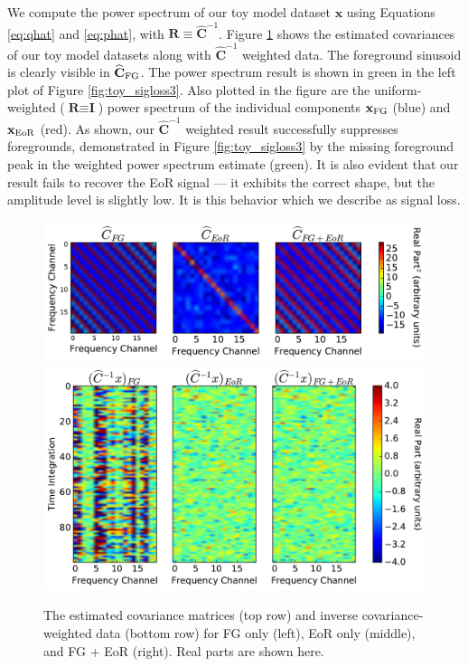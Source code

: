\documentclass[preprint2,numberedappendix,tighten]{aastex6}  %
\begin{document}
We compute the power spectrum of our toy model dataset $\textbf{x}$ using Equations \ref{eq:qhat} and \ref{eq:phat}, with $\textbf{R} \equiv \widehat{\textbf{C}}^{-1}$.  Figure \ref{fig:toy_sigloss12} shows the estimated covariances of our toy model datasets along with $\widehat{\textbf{C}}^{-1}$ weighted data. The foreground sinusoid is clearly visible in $\widehat{\textbf{C}}_{\rm FG}$.  The power spectrum result is shown in green in the left plot of Figure \ref{fig:toy_sigloss3}. Also plotted in the figure are the uniform-weighted ($\textbf{R} \equiv \textbf{I}$) power spectrum of the individual components $\textbf{x}_{\rm FG}$ (blue) and $\textbf{x}_{\rm EoR}$ (red). As shown, our $\widehat{\textbf{C}}^{-1}$ weighted result successfully suppresses foregrounds,
demonstrated in Figure \ref{fig:toy_sigloss3} by the missing foreground peak in the weighted power spectrum estimate (green).  It is also evident that our result fails to recover the EoR signal --- it exhibits the correct shape, but the amplitude level is slightly low.  It is this behavior which we describe as signal loss.

\begin{figure}
	\centering
	\includegraphics[trim={0cm 0cm 0cm 0cm},clip,width=\columnwidth]{plots/toy_sigloss12.pdf}
	\includegraphics[trim={0cm 0cm 0cm 0cm},clip,width=\columnwidth]{plots/toy_sigloss13.pdf}
	\caption{The estimated covariance matrices (top row) and inverse covariance-weighted data (bottom row) for FG only (left), EoR only 
(middle), and FG + EoR (right). Real parts are shown here.}
	\label{fig:toy_sigloss12}
\end{figure}
\end{document}
